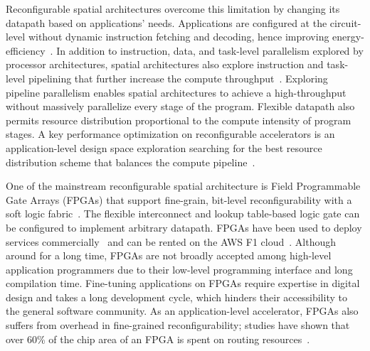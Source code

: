 Reconfigurable spatial architectures overcome this limitation by changing its datapath based on applications' needs.
Applications are configured at the circuit-level without dynamic instruction fetching and decoding,
hence improving energy-efficiency~\cite{calhoun,fpgaPower}.
In addition to instruction, data, and task-level parallelism explored by processor architectures, spatial architectures also explore instruction and task-level
pipelining that further increase the compute throughput~\cite{spatial-computation}.
Exploring pipeline parallelism enables spatial architectures to achieve a high-throughput
without massively parallelize every stage of the program.
Flexible datapath also permits resource distribution proportional to the compute intensity of
program stages.
A key performance optimization on reconfigurable accelerators is an application-level design space
exploration 
searching for the best resource distribution scheme that balances the compute pipeline~\cite{dse_koeplinger}.

One of the mainstream reconfigurable spatial architecture is 
Field Programmable Gate Arrays (FPGAs) that support fine-grain, 
bit-level reconfigurability with a soft logic fabric~\cite{fpga-survey}.
The flexible interconnect and lookup table-based logic gate can be configured to implement arbitrary
datapath.
FPGAs have been used to deploy services commercially~\cite{microsoft, baidu, deephi} and can be rented on the AWS F1 cloud~\cite{aws}. 
Although around for a long time, FPGAs are not broadly accepted among high-level application programmers due to their low-level programming interface and long compilation time.
Fine-tuning applications on FPGAs require expertise in digital design and takes a long
development cycle, which hinders their accessibility to the general software community.
As an application-level accelerator, FPGAs also suffers from overhead in fine-grained reconfigurability; 
studies have shown that over 60\% of the chip area of an FPGA is spent on routing resources~\cite{fpgaSurvey, calhoun, fpgaPower}. 



